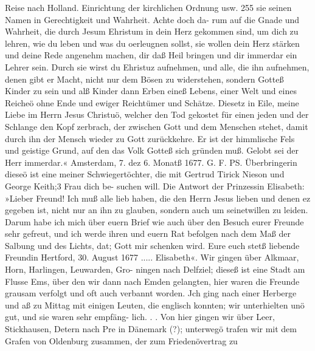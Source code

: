 Reise nach Holland. Einrichtung der kirchlichen Ordnung usw. 255
sie seinen Namen in Gerechtigkeit und Wahrheit. Achte doch da-
rum auf die Gnade und Wahrheit, die durch Jesum Ehristum
in dein Herz gekommen sind, um dich zu lehren, wie du leben
und was du oerleugnen sollst, sie wollen dein Herz stärken und
deine Rede angenehm machen, dir daß Heil bringen und dir
immerdar ein Lehrer sein. Durch sie wirst du Ehristuz aufnehmen,
und alle, die ihn aufnehmen, denen gibt er Macht, nicht nur dem
Bösen zu widerstehen, sondern Gotteß Kinder zu sein und alß
Kinder dann Erben eineß Lebens, einer Welt und eines Reicheö
ohne Ende und ewiger Reichtümer und Schätze. Diesetz in Eile,
meine Liebe im Herrn Jesus Christuö, welcher den Tod gekostet
für einen jeden und der Schlange den Kopf zerbrach, der zwischen
Gott und dem Menschen stehet, damit durch ihn der Mensch wieder
zu Gott zurückkehre. Er ist der himmlische Fels und geistige
Grund, auf den das Volk Gotteß sich gründen muß. Gelobt sei
der Herr immerdar.«
Amsterdam, 7. dez 6. Monatß 1677. G. F.
PS. Überbringerin dieseö ist eine meiner Schwiegertöchter,
die mit Gertrud Tirick Nieson und George Keith;3 Frau dich be-
suchen will.
Die Antwort der Prinzessin Elisabeth:
»Lieber Freund!
Ich muß alle lieb haben, die den Herrn Jesus lieben und
denen ez gegeben ist, nicht nur an ihn zu glauben, sondern auch
um seinetwillen zu leiden. Darum habe ich mich über euern
Brief wie auch über den Besuch eurer Freunde sehr gefreut, und
ich werde ihren und euern Rat befolgen nach dem Maß der
Salbung und des Lichts, dat; Gott mir schenken wird.
Eure euch stetß liebende Freundin
Hertford, 30. August 1677 ..... Elisabeth«.
Wir gingen über Alkmaar, Horn, Harlingen, Leuwarden, Gro-
ningen nach Delfziel; dieseß ist eine Stadt am Flusse Ems, über
den wir dann nach Emden gelangten, hier waren die Freunde
grausam verfolgt und oft auch verbannt worden. Jch ging nach
einer Herberge und aß zu Mittag mit einigen Leuten, die englisch
konnten; wir unterhielten unö gut, und sie waren sehr empfäng-
lich. . . Von hier gingen wir über Leer, Stickhausen, Detern
nach Pre in Dänemark (?); unterwegö trafen wir mit dem
Grafen von Oldenburg zusammen, der zum Friedenövertrag zu



